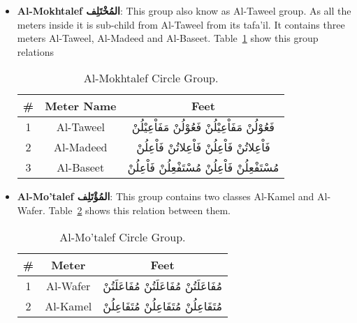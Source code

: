   
  \begin{itemize}
  \item \textbf{Al-Mokhtalef \textarabic{المُخْتَلِف}}: This group also know as Al-Taweel group. As all the meters inside it is sub-child from Al-Taweel from its tafa'il. It contains three meters Al-Taweel, Al-Madeed and Al-Baseet. Table~\ref{tab:AlMokhtalef_Group} show this group relations

\begin{table}[H]
  \centering
  \begin{tabular}{ c c c}
    \hline
    \textbf{\#} & \textbf{Meter Name}  & \textbf{Feet} \\
    \hline
    1 & \textarabic{Al-Taweel} & \textarabic{فَعُوْلُنْ مَفَاْعِيْلُنْ فَعُوْلُنْ مَفَاْعِيْلُنْ}\\
    2 &\textarabic{Al-Madeed}&  \textarabic{فَاْعِلاتُنْ فَاْعِلُنْ فَاْعِلاتُنْ فَاْعِلُنْ}\\
    3 &\textarabic{Al-Baseet}  & \textarabic{مُسْتَفْعِلُنْ فَاْعِلُنْ مُسْتَفْعِلُنْ فَاْعِلُنْ}\\
    \hline                                                
  \end{tabular}
\caption{Al-Mokhtalef Circle Group.}\label{tab:AlMokhtalef_Group}
\end{table}
    


\item \textbf{Al-Mo'talef \textarabic{المُؤْتَلِف}}: This group contains two classes Al-Kamel and Al-Wafer. Table~\ref{tab:Al-Mo'talef_Group} shows this relation between them.

\begin{table}[H]
  \centering
  \begin{tabular}{c c c}
    \hline
    \textbf{\#} & \textbf{Meter}  & \textbf{Feet} \\
    \hline
    1 & \textarabic{Al-Wafer} & \textarabic{مُفَاعَلَتُنْ مُفَاعَلَتُنْ مُفَاعَلَتُنْ}\\
    2 &\textarabic{Al-Kamel}&  \textarabic{مُتَفَاعِلُنْ مُتَفَاعِلُنْ مُتَفَاعِلُنْ}\\
    \hline                                                
  \end{tabular}
\caption{Al-Mo'talef Circle Group.}\label{tab:Al-Mo'talef_Group}
\end{table}
  

\end{itemize}
